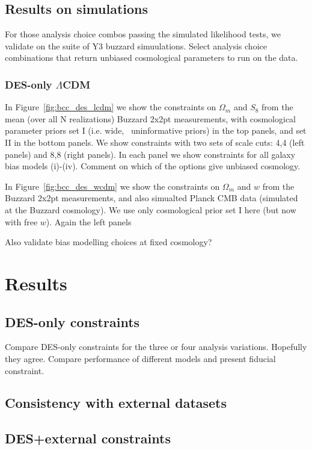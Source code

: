 \documentclass[fleqn,usenatbib]{mnras}
\newcommand{\lcdm}{$\Lambda$CDM}
\newcommand\fig[1]{Figure~\ref{#1}}
\begin{document}
\subsection{Results on simulations}

For those analysis choice combos passing the simulated likelihood tests, we validate on the suite of Y3 buzzard simuulations. Select analysis choice combinations that return unbiased cosmological parameters to run on the data. 

\subsubsection{DES-only \lcdm}

In \fig{fig:bcc_des_lcdm} we show the constraints on $\Omega_m$ and $S_8$ from the mean (over all N realizations) Buzzard 2x2pt measurements, with cosmological parameter priors set I (i.e. wide, ~uninformative priors) in the top panels, and set II in the bottom panels. We show constraints with two sets of scale cuts: 4,4 (left panels) and 8,8 (right panels). In each panel we show constraints for all galaxy bias models (i)-(iv). Comment on which of the options give unbiased cosmology. 

In \fig{fig:bcc_des_wcdm} we show the constraints on $\Omega_m$ and $w$ from the Buzzard 2x2pt measurements, and also simualted Planck CMB data (simulated at the Buzzard cosmology). We use only cosmological prior set I here (but now with free $w$). Again the left panels 


Also validate bias modelling choices at fixed cosmology?


\section{Results}

\subsection{DES-only constraints}

Compare DES-only constraints for the three or four analysis variations. Hopefully they agree. Compare performance of different models and present fiducial constraint.

\subsection{Consistency with external datasets}

\subsection{DES+external constraints}
\end{document}
